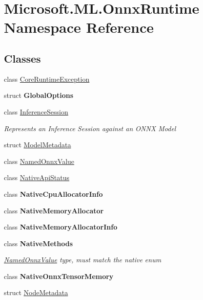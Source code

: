 \hypertarget{namespaceMicrosoft_1_1ML_1_1OnnxRuntime}{}\section{Microsoft.\+M\+L.\+Onnx\+Runtime Namespace Reference}
\label{namespaceMicrosoft_1_1ML_1_1OnnxRuntime}
\subsection*{Classes}
\begin{DoxyCompactItemize}
\item 
class \mbox{\hyperlink{classMicrosoft_1_1ML_1_1OnnxRuntime_1_1CoreRuntimeException}{Core\+Runtime\+Exception}}
\item 
struct {\bfseries Global\+Options}
\item 
class \mbox{\hyperlink{classMicrosoft_1_1ML_1_1OnnxRuntime_1_1InferenceSession}{Inference\+Session}}
\begin{DoxyCompactList}\small\item\em Represents an Inference Session against an O\+N\+NX Model \end{DoxyCompactList}\item 
struct \mbox{\hyperlink{structMicrosoft_1_1ML_1_1OnnxRuntime_1_1ModelMetadata}{Model\+Metadata}}
\item 
class \mbox{\hyperlink{classMicrosoft_1_1ML_1_1OnnxRuntime_1_1NamedOnnxValue}{Named\+Onnx\+Value}}
\item 
class \mbox{\hyperlink{classMicrosoft_1_1ML_1_1OnnxRuntime_1_1NativeApiStatus}{Native\+Api\+Status}}
\item 
class {\bfseries Native\+Cpu\+Allocator\+Info}
\item 
class {\bfseries Native\+Memory\+Allocator}
\item 
class {\bfseries Native\+Memory\+Allocator\+Info}
\item 
class {\bfseries Native\+Methods}
\begin{DoxyCompactList}\small\item\em \mbox{\hyperlink{classMicrosoft_1_1ML_1_1OnnxRuntime_1_1NamedOnnxValue}{Named\+Onnx\+Value}} type, must match the native enum \end{DoxyCompactList}\item 
class {\bfseries Native\+Onnx\+Tensor\+Memory}
\item 
struct \mbox{\hyperlink{structMicrosoft_1_1ML_1_1OnnxRuntime_1_1NodeMetadata}{Node\+Metadata}}

\end{DoxyCompactItemize}
